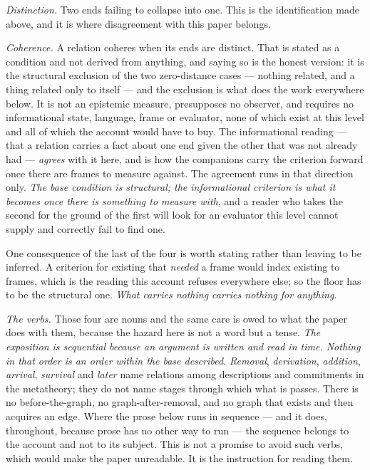 \documentclass[11pt,a4paper]{article}
\begin{document}
\emph{Distinction.} Two ends failing to collapse into one. This is the identification made above, and
it is where disagreement with this paper belongs.

\emph{Coherence.} A relation coheres when its ends are distinct. That is stated as a condition and
not derived from anything, and saying so is the honest version: it is the structural exclusion of the
two zero-distance cases --- nothing related, and a thing related only to itself --- and the exclusion
is what does the work everywhere below. It is not an epistemic measure, presupposes no observer, and
requires no informational state, language, frame or evaluator, none of which exist at this level and
all of which the account would have to buy. The informational reading --- that a relation carries a
fact about one end given the other that was not already had --- \emph{agrees} with it here, and is how
the companions carry the criterion forward once there are frames to measure against. The agreement runs
in that direction only. \emph{The base condition is structural; the informational criterion is what it
becomes once there is something to measure with}, and a reader who takes the second for the ground of
the first will look for an evaluator this level cannot supply and correctly fail to find one.

One consequence of the last of the four is worth stating rather than leaving to be inferred. A criterion for
existing that \emph{needed} a frame would index existing to frames, which is the reading this account
refuses everywhere else; so the floor has to be the structural one. \emph{What carries nothing carries
nothing for anything.}

\emph{The verbs.} Those four are nouns and the same care is owed to what the paper does with them,
because the hazard here is not a word but a tense. \emph{The exposition is sequential because an
argument is written and read in time. Nothing in that order is an order within the base described.}
\emph{Removal}, \emph{derivation}, \emph{addition}, \emph{arrival}, \emph{survival} and \emph{later}
name relations among descriptions and commitments in the metatheory; they do not name stages through
which what is passes. There is no before-the-graph, no graph-after-removal, and no graph that exists
and then acquires an edge. Where the prose below runs in sequence --- and it does, throughout, because
prose has no other way to run --- the sequence belongs to the account and not to its subject. This is
not a promise to avoid such verbs, which would make the paper unreadable. It is the instruction for
reading them.
\end{document}
